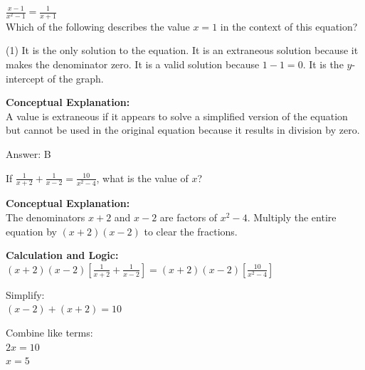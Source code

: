 \documentclass[11pt,paper=a4,answers]{exam}
\begin{document}
\begin{questions}
\question
$\frac{x-1}{x^2 - 1} = \frac{1}{x+1}$ \\
Which of the following describes the value $x = 1$ in the context of this equation?
\begin{tasks}(1)
    \task It is the only solution to the equation.
    \task It is an extraneous solution because it makes the denominator zero.
    \task It is a valid solution because $1-1=0$.
    \task It is the $y$-intercept of the graph.
\end{tasks}

\begin{solution}
\textbf{Conceptual Explanation:} \\
A value is extraneous if it appears to solve a simplified version of the equation but cannot be used in the original equation because it results in division by zero.

\vspace{25pt}

Answer: \colorbox{yellow!100}{B}
\end{solution}

\vspace{40pt}

\question
If $\frac{1}{x+2} + \frac{1}{x-2} = \frac{10}{x^2 - 4}$, what is the value of $x$?

\begin{solution}
\textbf{Conceptual Explanation:} \\
The denominators $x+2$ and $x-2$ are factors of $x^2-4$. Multiply the entire equation by $(x+2)(x-2)$ to clear the fractions.

\vspace{20pt}

\textbf{Calculation and Logic:} \\
$(x+2)(x-2) \left[ \frac{1}{x+2} + \frac{1}{x-2} \right] = (x+2)(x-2) \left[ \frac{10}{x^2 - 4} \right]$

\vspace{10pt}

Simplify: \\
$(x-2) + (x+2) = 10$

\vspace{10pt}

Combine like terms: \\
$2x = 10$ \\
$x = 5$


\end{solution}
\end{questions}
\end{document}
